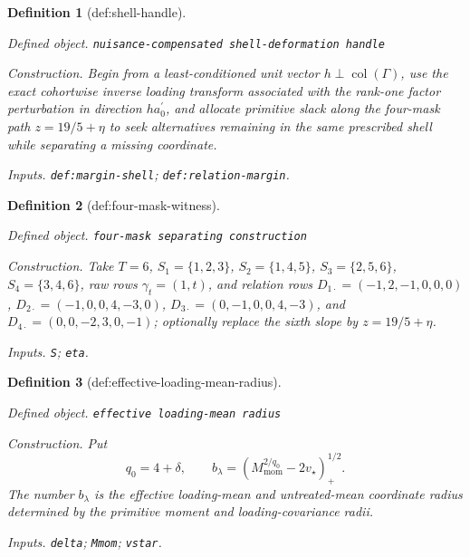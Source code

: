 \documentclass{article}
\newtheorem{definition}{Definition}
\begin{document}
\begin{definition}[def:shell-handle]\label{def:shell-handle}
\par\smallskip\noindent\emph{Defined object.} \texttt{nuisance-\allowbreak{}compensated shell-\allowbreak{}deformation handle}
\par\smallskip\noindent\emph{Construction.} Begin from a least-conditioned unit vector \(h\perp\operatorname{col}(\Gamma)\), use the exact cohortwise inverse loading transform associated with the rank-one factor perturbation in direction \(ha_0^{\prime}\), and allocate primitive slack along the four-mask path \(z=19/5+\eta\) to seek alternatives remaining in the same prescribed shell while separating a missing coordinate.
\par\smallskip\noindent\emph{Inputs.} \texttt{def:\allowbreak{}margin-\allowbreak{}shell}; \texttt{def:\allowbreak{}relation-\allowbreak{}margin}.
\end{definition}

\begin{definition}[def:four-mask-witness]\label{def:four-mask-witness}
\par\smallskip\noindent\emph{Defined object.} \texttt{four-\allowbreak{}mask separating construction}
\par\smallskip\noindent\emph{Construction.} Take \(T=6\), \(S_1=\{1,2,3\}\), \(S_2=\{1,4,5\}\), \(S_3=\{2,5,6\}\), \(S_4=\{3,4,6\}\), raw rows \(\gamma_t=(1,t)\), and relation rows \(D_{1\cdot}=(-1,2,-1,0,0,0)\), \(D_{2\cdot}=(-1,0,0,4,-3,0)\), \(D_{3\cdot}=(0,-1,0,0,4,-3)\), and \(D_{4\cdot}=(0,0,-2,3,0,-1)\); optionally replace the sixth slope by \(z=19/5+\eta\).
\par\smallskip\noindent\emph{Inputs.} \texttt{S}; \texttt{eta}.
\end{definition}

\begin{definition}[def:effective-loading-mean-radius]\label{def:effective-loading-mean-radius}
\par\smallskip\noindent\emph{Defined object.} \texttt{effective loading-\allowbreak{}mean radius}
\par\smallskip\noindent\emph{Construction.} Put
\[
q_0=4+\delta,
\qquad
b_\lambda=\left(M_{\mathrm{mom}}^{2/q_0}-2v_\star\right)_+^{1/2}.
\]
The number \(b_\lambda\) is the effective loading-mean and untreated-mean coordinate radius determined by the primitive moment and loading-covariance radii.
\par\smallskip\noindent\emph{Inputs.} \texttt{delta}; \texttt{Mmom}; \texttt{vstar}.
\end{definition}
\end{document}
